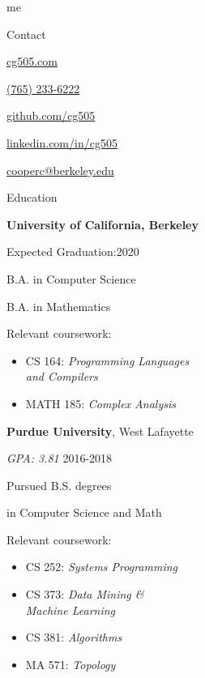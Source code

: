 \begin{minipage}[t]{0.305\textwidth}
  {\Huge me \phantom{my work}}

  \vspace{10pt}

  {\sectionfont Contact}
  \vspace{5pt}
  \begin{adjustwidth}{10pt}{}
    \href{https://cg505.com/}{cg505.com}

    \href{tel:+17652336222}{(765) 233-6222}

    \href{https://github.com/cg505/}{github.com/cg505}

    \href{https://linkedin.com/in/cg505}{linkedin.com/in/cg505}

    \href{mailto:cooperc@berkeley.edu}{cooperc@berkeley.edu}
  \end{adjustwidth}

  \vspace{10pt}

  {\sectionfont Education}

  \vspace{5pt}
  \textbf{University of California, Berkeley}
  \begin{adjustwidth}{10pt}{}
    Expected Graduation:\hfill2020

    B.A. in Computer Science

    B.A. in Mathematics


    Relevant coursework:
    \begin{itemize}[leftmargin=*]
    \item CS 164: \emph{Programming Languages}\\\phantom{CS 164:} \emph{and Compilers}
    \item MATH 185: \emph{Complex Analysis}
    \end{itemize}
  \end{adjustwidth}

  \vspace{5pt}
  \textbf{Purdue University}, West Lafayette
  \begin{adjustwidth}{10pt}{}
    \emph{GPA: 3.81} \hfill2016-2018

    Pursued B.S. degrees

    \enskip in Computer Science and Math


    Relevant coursework:
    \begin{itemize}[leftmargin=*]
    \item CS 252: \emph{Systems Programming}
    \item CS 373: \emph{Data Mining \&}\\\phantom{CS 373:} \emph{Machine Learning}
    \item CS 381: \emph{Algorithms}
    \item MA 571: \emph{Topology}
    \end{itemize}
  \end{adjustwidth}


\end{minipage}
